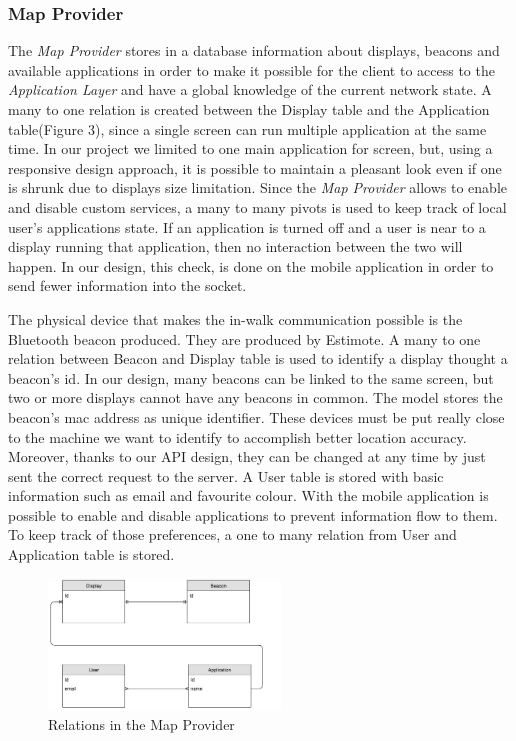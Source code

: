 \documentclass[]{usiinfbachelorproject}
\begin{document}
\subsubsection{Map Provider}
The \emph{Map Provider} stores in a database information about displays, beacons and available applications in order to make it possible for the client to access to the \emph{Application Layer} and have a global knowledge of the current network state. A many to one relation is created between the Display table and the Application table(Figure 3), since a single screen can run multiple application at the same time. In our project we limited to one main application for screen, but, using a responsive design approach, it is possible to maintain a pleasant look even if one is shrunk due to displays size limitation. Since the \emph{Map Provider} allows to enable and disable custom services, a many to many pivots is used to keep track of local user's applications state. If an application is turned off and a user is near to a display running that application, then no interaction between the two will happen. In our design, this check, is done on the mobile application in order to send fewer information into the socket.

The physical device that makes the in-walk communication possible is the Bluetooth beacon produced. They are produced by Estimote. A many to one relation between Beacon and Display table is used to identify a display thought a beacon's id. In our design, many beacons can be linked to the same screen, but two or more displays cannot have any beacons in common. The model stores the beacon's mac address as unique identifier. These devices must be put really close to the machine we want to identify to accomplish better location accuracy. Moreover, thanks to our API design, they can be changed at any time by just sent the correct request to the server. 
A User table is stored with basic information such as email and favourite colour. With the mobile application is possible to enable and disable applications to prevent information flow to them. To keep track of those preferences, a one to many relation from User and Application table is stored. 
\begin{figure}[H]
  \centering
  \includegraphics[width=0.55\textwidth]{./images/TacitaRelations.jpg}
   \caption{Relations in the Map Provider}

\end{figure} 
\end{document}
